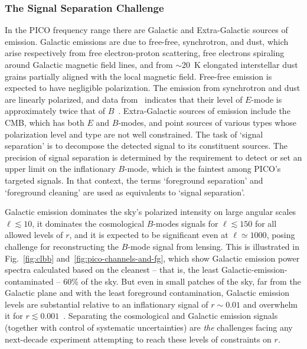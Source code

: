 \documentclass[PICOReport.tex]{subfiles}
\begin{document}

\subsubsection{The Signal Separation Challenge}
\label{sec:separation_challenge}

In the PICO frequency range there are Galactic and Extra-Galactic sources of emission. Galactic emissions are due to free-free, synchrotron, and dust, which arise respectively from free electron-proton scattering, free electrons spiraling around Galactic magnetic field lines, and from $\sim$20~K elongated interstellar dust grains partially aligned with the local magnetic field. Free-free emission is expected to have negligible polarization. The emission from synchrotron and dust are linearly polarized, and data from \planck\ indicates that their level of $E$-mode is approximately twice that of $B$~\cite{planckEB}. Extra-Galactic sources of emission include the CMB, which has both $E$ and $B$-modes, and point sources of various types whose polarization level and type are not well constrained. The task of `signal separation' is to decompose the detected signal to its constituent sources. The precision of signal separation is determined by the requirement to detect or set an upper limit on the inflationary $B$-mode, which is the faintest among PICO's targeted signals. In that context, the terms `foreground separation' and `foreground cleaning' are used as equivalents to `signal separation'. 

Galactic emission dominates the sky's polarized intensity on large angular scales $\ell \lesssim 10$, it dominates the cosmological $B$-modes signals for $\ell \lesssim 150$ for all allowed levels of $r$, and it is expected to be significant even at $\ell \simeq 1000$, posing challenge for reconstructing the $B$-mode signal from lensing. This is illustrated in Fig.~\ref{fig:clbb} and~\ref{fig:pico-channels-and-fg}, which show Galactic emission power spectra calculated based on the cleanest -- that is, the least Galactic-emission-contaminated -- 60\% of the sky. But even in small patches of the sky, far from the Galactic plane and with the least foreground contamination, Galactic emission levels are substantial relative to an inflationary signal of $r \sim 0.01$ and overwhelm it for $r \lesssim0.001$~\cite{planckEB}. Separating the cosmological and Galactic emission signals (together with control of systematic uncertainties) are {\it the} challenges facing any next-decade experiment attempting to reach these levels of constraints on $r$.
\end{document}
